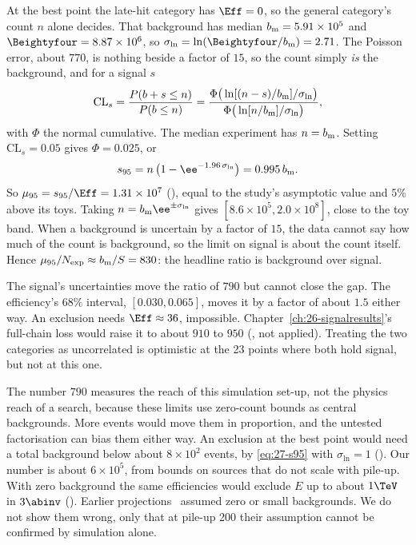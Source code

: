 \begin{example}\label{exa:27-limit}
At the best point the late-hit category has $\Eff=0$, so the general category's count $n$ alone decides. That background has median $b_{\rm m}=5.91\times10^5$ and $\Beightyfour=8.87\times10^6$, so $\sigma_{\ln}=\ln(\Beightyfour/b_{\rm m})=2.71$. The Poisson error, about $770$, is nothing beside a factor of $15$, so the count simply \emph{is} the background, and for a signal $s$
\[
  \mathrm{CL}_s=\frac{P(b+s\le n)}{P(b\le n)}=\frac{\Phi\big(\ln[(n-s)/b_{\rm m}]/\sigma_{\ln}\big)}{\Phi\big(\ln[n/b_{\rm m}]/\sigma_{\ln}\big)},
\]
with $\Phi$ the normal cumulative. The median experiment has $n=b_{\rm m}$. Setting $\mathrm{CL}_s=0.05$ gives $\Phi=0.025$, or
\begin{equation}
  s_{95}=n\left(1-\ee^{-1.96\,\sigma_{\ln}}\right)=0.995\,b_{\rm m}.
  \label{eq:27-s95}
\end{equation}
So $\mu_{95}=s_{95}/\Eff=1.31\times10^7$ (\EST), equal to the study's asymptotic value and $5\%$ above its toys. Taking $n=b_{\rm m}\ee^{\pm\sigma_{\ln}}$ gives $[8.6\times10^5,2.0\times10^8]$, close to the toy band. When a background is uncertain by a factor of $15$, the data cannot say how much of the count is background, so the limit on signal is about the count itself. Hence $\mu_{95}/N_{\rm exp}\approx b_{\rm m}/S=830$: the headline ratio is background over signal.
\end{example}

The signal's uncertainties move the ratio of $790$ but cannot close the gap. The efficiency's $68\%$ interval, $[0.030,0.065]$, moves it by a factor of about $1.5$ either way. An exclusion needs $\Eff\approx36$, impossible. Chapter~\ref{ch:26-signalresults}'s full-chain loss would raise it to about $910$ to $950$ (\EST, not applied). Treating the two categories as uncorrelated is optimistic at the 23 points where both hold signal, but not at this one.

The number $790$ measures the reach of this simulation set-up, not the physics reach of a search, because these limits use zero-count bounds as central backgrounds. More events would move them in proportion, and the untested factorisation can bias them either way. An exclusion at the best point would need a total background below about $8\times10^2$ events, by \eqref{eq:27-s95} with $\sigma_{\ln}=1$ (\EST). Our number is about $6\times10^5$, from bounds on sources that do not scale with pile-up. With zero background the same efficiencies would exclude $E$ up to about $1\TeV$ in $3\abinv$ (\EST). Earlier projections~\cite{Knapen:2017kly,Li:2019wce} assumed zero or small backgrounds. We do not show them wrong, only that at pile-up 200 their assumption cannot be confirmed by simulation alone.

